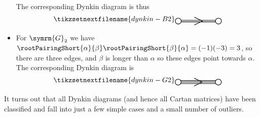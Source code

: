 \documentclass[fleqn]{NotesClass}
\newcommand{\dynkin}[2]{\symrm{#1}_{#2}}
\begin{document}
\begin{exm}{}{}
\begin{itemize}
            The corresponding Dynkin diagram is thus
            \begin{equation}
                \tikzsetnextfilename{dynkin-B2}
                \begin{tikzpicture}[baseline=(current bounding box)]
                    \draw[thick, yshift=0.04cm] (0, 0) -- (2, 0);
                    \draw[thick, yshift=-0.04cm] (0, 0) -- (2, 0);
                    \draw[thick, fill=white] (0, 0) circle [radius=0.15];
                    \draw[thick, fill=white] (2, 0) circle [radius=0.15];
                    \draw[thick] (0.8, 0.2) -- (1.2, 0) -- (0.8, -0.2);
                \end{tikzpicture}
            \end{equation}
            \item For \(\dynkin{G}{2}\) we have \(\rootPairingShort{\alpha}{\beta} \rootPairingShort{\beta}{\alpha} = (-1)(-3) = 3\), so there are three edges, and \(\beta\) is longer than \(\alpha\) so these edges point towards \(\alpha\).
            The corresponding Dynkin diagram is
            \begin{equation}
                \tikzsetnextfilename{dynkin-G2}
                \begin{tikzpicture}[baseline=(current bounding box)]
                    \draw[thick] (0, 0) -- (2, 0);
                    \draw[thick, yshift=0.075cm] (0, 0) -- (2, 0);
                    \draw[thick, yshift=-0.075cm] (0, 0) -- (2, 0);
                    \draw[thick, fill=white] (0, 0) circle [radius=0.15];
                    \draw[thick, fill=white] (2, 0) circle [radius=0.15];
                    \draw[thick] (0.8, 0.2) -- (1.2, 0) -- (0.8, -0.2);
                \end{tikzpicture}
            \end{equation}
        \end{itemize}
    \end{exm}
    
    It turns out that all Dynkin diagrams (and hence all Cartan matrices) have been classified and fall into just a few simple cases and a small number of outliers.
    
\end{document}
